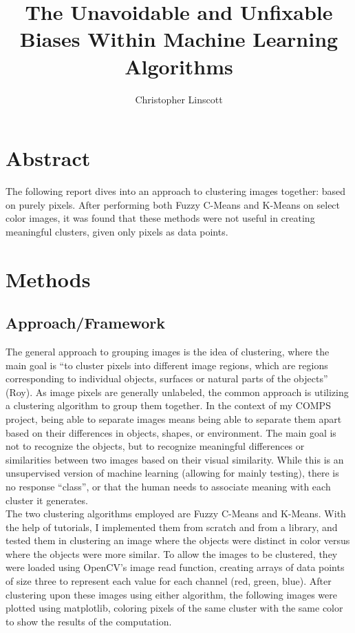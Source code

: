 \documentclass[10pt,twocolumn]{article}
\title{The Unavoidable and Unfixable Biases Within Machine Learning Algorithms}
\author{Christopher Linscott}
\affiliation{Occidental College}
\begin{document}
\maketitle


\section {Abstract}
\indent
The following report dives into an approach to clustering images together: based on purely pixels. After performing both Fuzzy C-Means and K-Means on select color images, it was found that these methods were not useful in creating meaningful clusters, given only pixels as data points.

\section {Methods}

\subsection {Approach/Framework}

\indent The general approach to grouping images is the idea of clustering, where the main goal is “to cluster pixels into different image regions, which are regions corresponding to individual objects, surfaces or natural parts of the objects” (Roy). As image pixels are generally unlabeled, the common approach is utilizing a clustering algorithm to group them together. In the context of my COMPS project, being able to separate images means being able to separate them apart based on their differences in objects, shapes, or environment. The main goal is not to recognize the objects, but to recognize meaningful differences or similarities between two images based on their visual similarity. While this is an unsupervised version of machine learning (allowing for mainly testing), there is no response “class”, or that the human needs to associate meaning with each cluster it generates.
\\
\indent The two clustering algorithms employed are Fuzzy C-Means and K-Means. With the help of tutorials, I implemented them from scratch and from a library, and tested them in clustering an image where the objects were distinct in color versus where the objects were more similar. To allow the images to be clustered, they were loaded using OpenCV’s image read function, creating arrays of data points of size three to represent each value for each channel (red, green, blue). After clustering upon these images using either algorithm, the following images were plotted using matplotlib, coloring pixels of the same cluster with the same color to show the results of the computation. 
\end{document}
